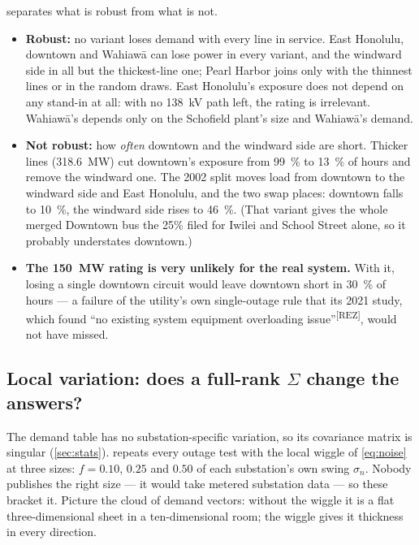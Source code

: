 \documentclass[11pt,a4paper]{article}
\newcommand{\src}[1]{\textsuperscript{[#1]}}
\begin{document}
 separates what is robust from what is not.
\begin{itemize}
  \item \textbf{Robust:} no variant loses demand with every line in service. East
        Honolulu, downtown and Wahiaw\=a can lose power in every variant, and the
        windward side in all but the thickest-line one; Pearl Harbor joins only with
        the thinnest lines or in the random draws. East Honolulu's exposure does not
        depend on any stand-in at all: with no \SI{138}{kV} path left, the rating is
        irrelevant. Wahiaw\=a's depends only on the Schofield plant's size and
        Wahiaw\=a's demand.
  \item \textbf{Not robust:} how \emph{often} downtown and the windward side are
        short.
        Thicker lines (\SI{318.6}{MW}) cut downtown's exposure from \SI{99}{\percent}
        to \SI{13}{\percent} of hours and remove the windward one. The 2002 split moves
        load from downtown to the windward side and East Honolulu, and the two swap
        places: downtown falls to \SI{10}{\percent}, the windward side rises to
        \SI{46}{\percent}. (That variant gives the whole merged Downtown bus the 25\%
        filed for Iwilei and School Street alone, so it probably understates downtown.)
  \item \textbf{The \SI{150}{MW} rating is very unlikely for the real system.} With it,
        losing a single downtown circuit would leave downtown short in
        \SI{30}{\percent} of hours --- a failure of the utility's own single-outage
        rule that its 2021 study, which found ``no existing system equipment
        overloading issue''\src{REZ}, would not have missed.
\end{itemize}

\subsection{Local variation: does a full-rank $\Sigma$ change the answers?}
\label{sec:noise}

The demand table has no substation-specific variation, so its covariance matrix is
singular (\cref{sec:stats}).  repeats every outage test with the local
wiggle of \cref{eq:noise} at three sizes: $f = 0.10$, $0.25$ and $0.50$ of each
substation's own swing $\sigma_n$. Nobody publishes the right size --- it would take
metered substation data --- so these bracket it. Picture the cloud of demand vectors:
without the wiggle it is a flat three-dimensional sheet in a ten-dimensional room; the
wiggle gives it thickness in every direction.
\end{document}
